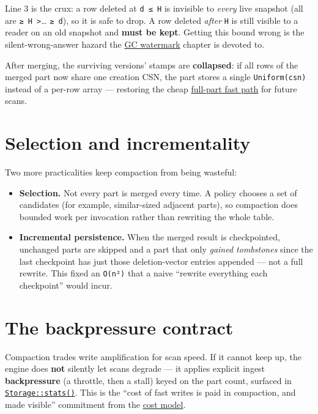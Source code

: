 \documentclass[
  11pt,
  openany]{book}
\providecommand{\tightlist}{%
  \setlength{\itemsep}{0pt}\setlength{\parskip}{0pt}}
\begin{document}
Line 3 is the crux: a row deleted at \texttt{d\ ≤\ H} is invisible to
\emph{every} live snapshot (all are
\texttt{≥\ H\ \textgreater{}}\ldots{} \texttt{≥\ d}), so it is safe to
drop. A row deleted \emph{after} \texttt{H} is still visible to a reader
on an old snapshot and \textbf{must be kept}. Getting this bound wrong
is the silent-wrong-answer hazard the \href{mvcc.md}{GC watermark}
chapter is devoted to.

After merging, the surviving versions' stamps are \textbf{collapsed}: if
all rows of the merged part now share one creation CSN, the part stores
a single \texttt{Uniform(csn)} instead of a per-row array --- restoring
the cheap \href{mvcc.md}{full-part fast path} for future scans.

\section{Selection and
incrementality}\label{selection-and-incrementality}

Two more practicalities keep compaction from being wasteful:

\begin{itemize}
\tightlist
\item
  \textbf{Selection.} Not every part is merged every time. A policy
  chooses a set of candidates (for example, similar-sized adjacent
  parts), so compaction does bounded work per invocation rather than
  rewriting the whole table.
\item
  \textbf{Incremental persistence.} When the merged result is
  checkpointed, unchanged parts are skipped and a part that only
  \emph{gained tombstones} since the last checkpoint has just those
  deletion-vector entries appended --- not a full rewrite. This fixed an
  \texttt{O(n²)} that a naive ``rewrite everything each checkpoint''
  would incur.
\end{itemize}

\section{The backpressure contract}\label{the-backpressure-contract}

Compaction trades write amplification for scan speed. If it cannot keep
up, the engine does \textbf{not} silently let scans degrade --- it
applies explicit ingest \textbf{backpressure} (a throttle, then a stall)
keyed on the part count, surfaced in
\href{../getting-started/getting-started.md}{\texttt{Storage::stats()}}.
This is the ``cost of fast writes is paid in compaction, and made
visible'' commitment from the
\href{../introduction/introduction.md}{cost model}.
\end{document}

